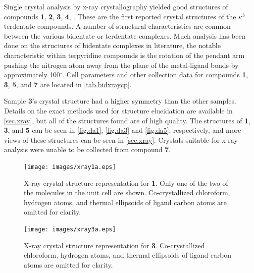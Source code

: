 Single crystal analysis by x-ray crystallography yielded good structures of compounds \textbf{1}, \textbf{2}, \textbf{3}, \textbf{4}, . These are the first reported crystal structures of the $\kappa ^3$ terdentate  compounds. A number of structural characteristics are common between the various bidentate or terdentate complexes. Much analysis has been done on the structures of bidentate complexes in literature, the notable characteristic within terpyridine compounds is the rotation of the pendant arm pushing the nitrogen atom away from the plane of the metal-ligand bonds by approximately 100$^\circ$. Cell parameters and other collection data for compounds \textbf{1}, \textbf{3}, \textbf{5}, and \textbf{7} are located in \autoref{tab.bidxraycp}.

Sample \textbf{3}'s crystal structure had a higher symmetry than the other samples. Details on the exact methods used for structure elucidation are available in \autoref{sec.xray}, but all of the structures found are of high quality. The structures of \textbf{1}, \textbf{3}, and \textbf{5} can be seen in \autoref{fig.da1}, \autoref{fig.da3} and \autoref{fig.da5}, respectively, and more views of these structures can be seen in \autoref{sec.xray}. Crystals suitable for x-ray analysis were unable to be collected from compound \textbf{7}. 

\begin{figure}[!htbp]
 \begin{center}
  \texttt{[image: images/xray1a.eps]}
 \end{center}
\caption[X-ray crystal structure representation for \textbf{1}.]{X-ray crystal structure representation for \textbf{1}. Only one of the two of the molecules in the unit cell are shown. Co-crystallized chloroform, hydrogen atoms, and thermal ellipsoids of ligand carbon atoms are omitted for clarity.}
\label{fig.da1}
\end{figure}

\begin{figure}[!htbp]
 \begin{center}
  \texttt{[image: images/xray3a.eps]}
 \end{center}
\caption[X-ray crystal structure representation for \textbf{3}.]{X-ray crystal structure representation for \textbf{3}. Co-crystallized chloroform, hydrogen atoms, and thermal ellipsoids of ligand carbon atoms are omitted for clarity.}
\label{fig.da3}
\end{figure}

